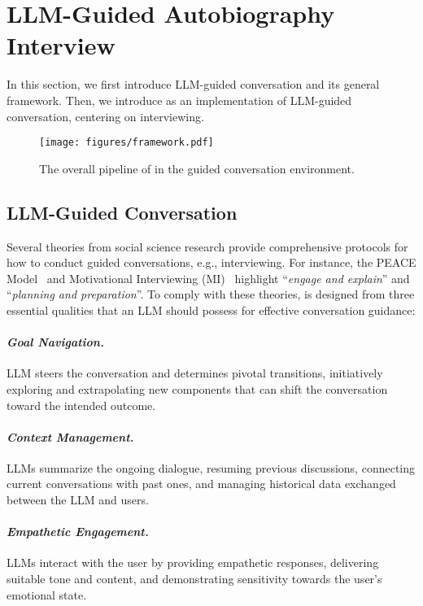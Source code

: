 \section{LLM-Guided Autobiography Interview}
In this section, we first introduce LLM-guided conversation and its general framework. Then, we introduce \methodname as an implementation of LLM-guided conversation, centering on interviewing.

\begin{figure*}[t]
    \centering
    \texttt{[image: figures/framework.pdf]}
    \caption{The overall pipeline of \methodname in the guided conversation environment.}
    \label{fig:llm_as_autobiographer}
    \vspace{-5mm}
\end{figure*}

\subsection{LLM-Guided Conversation}
Several theories from social science research provide comprehensive protocols for how to conduct guided conversations, e.g., interviewing. For instance, the PEACE Model~\cite{clarke2001national} and Motivational Interviewing (MI)~\cite{hettema2005motivational} highlight ``\textit{engage and explain}'' and ``\textit{planning and preparation}''. To comply with these theories, \methodname is designed from three essential qualities that an LLM should possess for effective conversation guidance:

\paragraph{\textit{Goal Navigation.}} LLM steers the conversation and determines pivotal transitions, initiatively exploring and extrapolating new components that can shift the conversation toward the intended outcome.
\paragraph{\textit{Context Management.}} LLMs summarize the ongoing dialogue, resuming previous discussions, connecting current conversations with past ones, and managing historical data exchanged between the LLM and users.
\paragraph{\textit{Empathetic Engagement.}} LLMs interact with the user by providing empathetic responses, delivering suitable tone and content, and demonstrating sensitivity towards the user's emotional state.

